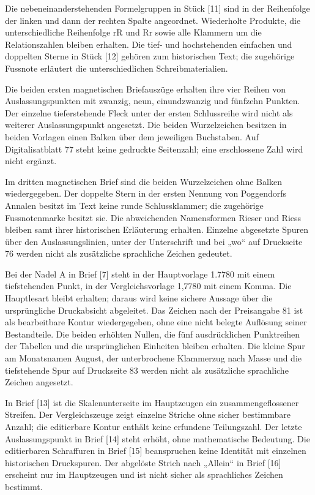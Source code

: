 Die nebeneinanderstehenden Formelgruppen in Stück [11] sind in der Reihenfolge der linken und dann der rechten Spalte angeordnet. Wiederholte Produkte, die unterschiedliche Reihenfolge rR und Rr sowie alle Klammern um die Relationszahlen bleiben erhalten. Die tief- und hochstehenden einfachen und doppelten Sterne in Stück [12] gehören zum historischen Text; die zugehörige Fussnote erläutert die unterschiedlichen Schreibmaterialien.

Die beiden ersten magnetischen Briefauszüge erhalten ihre vier Reihen von Auslassungspunkten mit zwanzig, neun, einundzwanzig und fünfzehn Punkten. Der einzelne tieferstehende Fleck unter der ersten Schlussreihe wird nicht als weiterer Auslassungspunkt angesetzt. Die beiden Wurzelzeichen besitzen in beiden Vorlagen einen Balken über dem jeweiligen Buchstaben. Auf Digitalisatblatt 77 steht keine gedruckte Seitenzahl; eine erschlossene Zahl wird nicht ergänzt.

Im dritten magnetischen Brief sind die beiden Wurzelzeichen ohne Balken wiedergegeben. Der doppelte Stern in der ersten Nennung von Poggendorfs Annalen besitzt im Text keine runde Schlussklammer; die zugehörige Fussnotenmarke besitzt sie. Die abweichenden Namensformen Rieser und Riess bleiben samt ihrer historischen Erläuterung erhalten. Einzelne abgesetzte Spuren über den Auslassungslinien, unter der Unterschrift und bei „wo“ auf Druckseite 76 werden nicht als zusätzliche sprachliche Zeichen gedeutet.

Bei der Nadel A in Brief [7] steht in der Hauptvorlage 1.7780 mit einem tiefstehenden Punkt, in der Vergleichsvorlage 1,7780 mit einem Komma. Die Hauptlesart bleibt erhalten; daraus wird keine sichere Aussage über die ursprüngliche Druckabsicht abgeleitet. Das Zeichen nach der Preisangabe 81 ist als bearbeitbare Kontur wiedergegeben, ohne eine nicht belegte Auflösung seiner Bestandteile. Die beiden erhöhten Nullen, die fünf ausdrücklichen Punktreihen der Tabellen und die ursprünglichen Einheiten bleiben erhalten. Die kleine Spur am Monatsnamen August, der unterbrochene Klammerzug nach Masse und die tiefstehende Spur auf Druckseite 83 werden nicht als zusätzliche sprachliche Zeichen angesetzt.

In Brief [13] ist die Skalenunterseite im Hauptzeugen ein zusammengeflossener Streifen. Der Vergleichszeuge zeigt einzelne Striche ohne sicher bestimmbare Anzahl; die editierbare Kontur enthält keine erfundene Teilungszahl. Der letzte Auslassungspunkt in Brief [14] steht erhöht, ohne mathematische Bedeutung. Die editierbaren Schraffuren in Brief [15] beanspruchen keine Identität mit einzelnen historischen Druckspuren. Der abgelöste Strich nach „Allein“ in Brief [16] erscheint nur im Hauptzeugen und ist nicht sicher als sprachliches Zeichen bestimmt.

